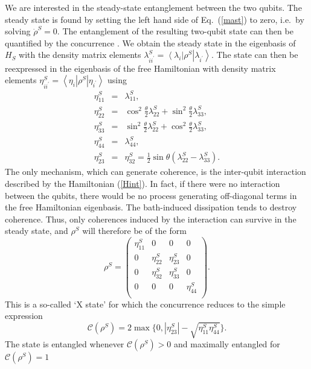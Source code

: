 \documentclass[12pt]{iopart}
\begin{document}
We are interested in the steady-state entanglement between the two qubits. The steady state is found by setting the left hand side of Eq.~(\ref{mast}) to zero, i.e.~by solving $\dot{\rho}^{S}=0$. The entanglement of the resulting two-qubit state can then be quantified by the concurrence \cite{con}. We obtain the steady state in the eigenbasis of $H_S$ with the density matrix elements $\lambda_{ii^{\prime}}^{S}=\left\langle\lambda_{i}\right|\rho^{S}\left|\lambda_{i^{\prime}}\right\rangle$. The state can then be reexpressed in the eigenbasis of the free Hamiltonian with density matrix elements $\eta_{ii^{\prime}}^{S}=
\left\langle\eta_{i}\right|\rho^{S}\left|\eta_{i^{\prime}}\right\rangle$ using
\begin{eqnarray}\label{eta}
\eta_{11}^{S}&=&\lambda_{11}^{S}, \nonumber\\
\eta_{22}^{S}&=& \cos^2\frac{\theta}{2} \lambda_{22}^{S}+ \sin^2\frac{\theta}{2}\lambda_{33}^{S} , \nonumber\\
\eta_{33}^{S}&=& \sin^2\frac{\theta}{2}\lambda_{22}^{S}  + \cos^2\frac{\theta}{2}\lambda_{33}^{S}, \nonumber\\
\eta_{44}^{S}&=&\lambda_{44}^{S}, \nonumber\\
\eta_{23}^{S}&=&\eta_{32}^{S} = \frac{1}{2}\sin\theta(\lambda_{22}^{S}-\lambda_{33}^{S}).
\end{eqnarray}
The only mechanism, which can generate coherence, is the inter-qubit interaction described by the Hamiltonian (\ref{Hint}). In fact, if there were no interaction between the qubits, there would be no process generating off-diagonal terms in the free Hamiltonian eigenbasis. The bath-induced dissipation tends to destroy coherence. Thus, only coherences induced by the interaction can survive in the steady state, and $\rho^S$ will therefore be of the form
\begin{equation}\label{X}
\rho^{S}=\left(
       \begin{array}{cccc}
         \eta_{11}^{S} & 0 & 0 & 0 \\
         0 & \eta_{22}^{S} & \eta_{23}^{S} & 0 \\
         0 & \eta_{32}^{S} & \eta_{33}^{S} & 0 \\
         0 & 0 & 0 & \eta_{44}^{S} \\
       \end{array}
     \right) .
\end{equation}
This is a so-called `X state' for which the concurrence reduces to the simple expression \cite{xtype}
\begin{equation}
\mathcal{C}(\rho^{S})=2 \max\{0,|\eta_{23}^{S}|-\sqrt{\eta_{11}^{S}\eta_{44}^{S}}\}.
\end{equation}
The state is entangled whenever $\mathcal{C}(\rho^{S}) > 0$ and maximally entangled for  $\mathcal{C}(\rho^{S}) = 1$
\end{document}
